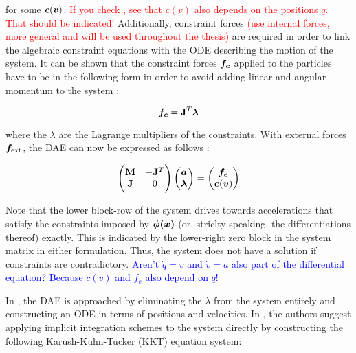 for some $\bm{c}(\bm{v})$. \textcolor{red}{If you check \cite{ascher1995}, see that $c(v)$ also depends on the positions $q$. That should 
be indicated!} 
Additionally, constraint forces \textcolor{red}{(use internal forces, more general and will be used throughout the thesis)} are 
required in order to link the algebraic constraint equations with the ODE describing the motion of 
the system. It can be shown that the constraint forces $\bm{f_c}$ applied to the particles have to be in the following form in order to 
avoid adding linear and angular momentum to the system \cite{baraff1996}:

\begin{equation}\label{eq:constraint-forces}
    \bm{f_c} = \mathbf{J}^T \bm{\lambda}
\end{equation}

where the $\lambda$ are the Lagrange multipliers of the constraints. With external forces $\bm{f}_{\text{ext}}$, the DAE can now be 
expressed as follows 
\cite{ascher1995}:

\[
    \begin{pmatrix}
        \mathbf{M} & -\mathbf{J}^T \\
        \mathbf{J} & 0
    \end{pmatrix}
    \begin{pmatrix}
        \bm{a} \\
        \bm{\lambda}
    \end{pmatrix}
    =
    \begin{pmatrix}
        \bm{f_e} \\
        \bm{c}(\bm{v})
    \end{pmatrix}
\]

Note that the lower block-row of the system drives towards accelerations that satisfy the constraints imposed by $\bm{\phi(x)}$ (or, striclty 
speaking, the differentiations thereof) exactly. This is indicated by the lower-right zero block in the system matrix in either formulation. 
Thus, the system does not have a solution if constraints are contradictory. \textcolor{blue}{Aren't $\dot{q} = v$ and $\dot{v} = a$ 
also part of the differential equation? Because $c(v)$ and $f_e$ also depend on $q$!}

In \cite{ascher1995}, the DAE is approached by eliminating the $\lambda$ from the system entirely and constructing an ODE in terms of positions
and velocities. In \cite{tournier2015}, the authors suggest applying implicit integration schemes to the system directly by constructing the 
following Karush-Kuhn-Tucker (KKT) equation system:

